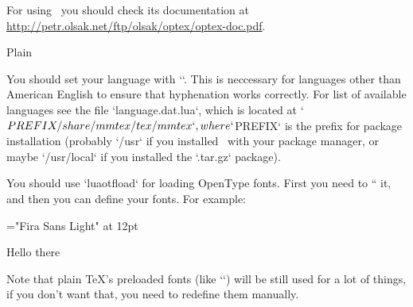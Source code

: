 For using \OpTeX\ you should check its documentation at
\url{http://petr.olsak.net/ftp/olsak/optex/optex-doc.pdf}.

\secc Plain \LuaTeX

You should set your language with ``. This is
neccessary for languages other than American English to ensure that hyphenation
works correctly. For list of available languages see the file `language.dat.lua`, which is located at
`$PREFIX/share/mmtex/tex/mmtex`, where `$PREFIX` is the prefix
for package installation (probably `/usr` if you installed \MMTeX\ with your package
manager, or maybe `/usr/local` if you installed the `.tar.gz` package).

You should use `luaotfload` for loading OpenType fonts. First you need to
`` it, and then you can define your fonts. For example:

\begtt


\font\mainfont="Fira Sans Light" at 12pt
\mainfont

Hello there
\bye
\endtt

Note that plain \TeX's preloaded fonts (like `\tenrm`) will be still used for a lot of things,
if you don't want that, you need to redefine them manually.

\bye
